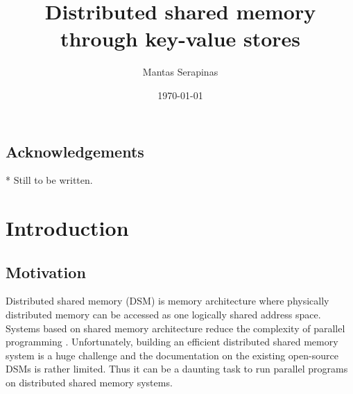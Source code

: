 \documentclass[bsc,frontabs,twoside,singlespacing,parskip,deptreport]{infthesis}     %
\begin{document}
\title{Distributed shared memory through key-value stores}

\author{Mantas Serapinas}



\date{\today}



\maketitle


\section*{Acknowledgements}
* Still to be written.

\tableofcontents



\chapter{Introduction}

\section{Motivation}

Distributed shared memory (DSM) is memory architecture where physically distributed memory can be accessed as one logically shared address space. Systems based on shared memory architecture reduce the complexity of parallel programming \citep{vodca}. Unfortunately, building an efficient distributed shared memory system is a huge challenge and the documentation on the existing open-source DSMs is rather limited. Thus it can be a daunting task to run parallel programs on distributed shared memory systems.
\end{document}
